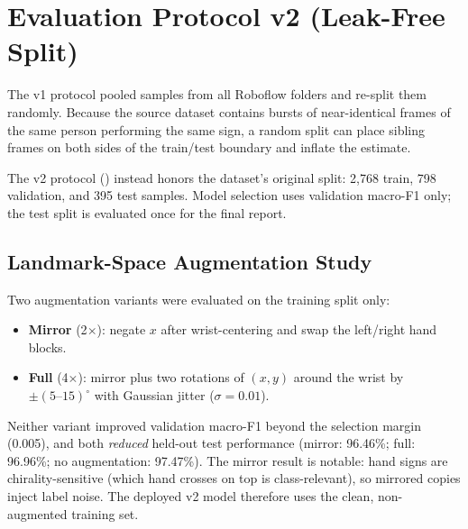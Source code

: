 \section{Evaluation Protocol v2 (Leak-Free Split)}
The v1 protocol pooled samples from all Roboflow folders and re-split them
randomly. Because the source dataset contains bursts of near-identical frames
of the same person performing the same sign, a random split can place sibling
frames on both sides of the train/test boundary and inflate the estimate.

The v2 protocol (\texttt{})
instead honors the dataset's original split: 2{,}768 train, 798 validation,
and 395 test samples. Model selection uses validation macro-F1 only; the test
split is evaluated once for the final report.

\subsection{Landmark-Space Augmentation Study}
Two augmentation variants were evaluated on the training split only:
\begin{itemize}[leftmargin=2em]
\item \textbf{Mirror} (2$\times$): negate $x$ after wrist-centering and swap
the left/right hand blocks.
\item \textbf{Full} (4$\times$): mirror plus two rotations of $(x,y)$ around
the wrist by $\pm(5\text{--}15)^{\circ}$ with Gaussian jitter
($\sigma = 0.01$).
\end{itemize}
Neither variant improved validation macro-F1 beyond the selection margin
(0.005), and both \emph{reduced} held-out test performance (mirror:
96.46\%; full: 96.96\%; no augmentation: 97.47\%). The mirror result is
notable: hand signs are chirality-sensitive (which hand crosses on top is
class-relevant), so mirrored copies inject label noise. The deployed v2
model therefore uses the clean, non-augmented training set.

